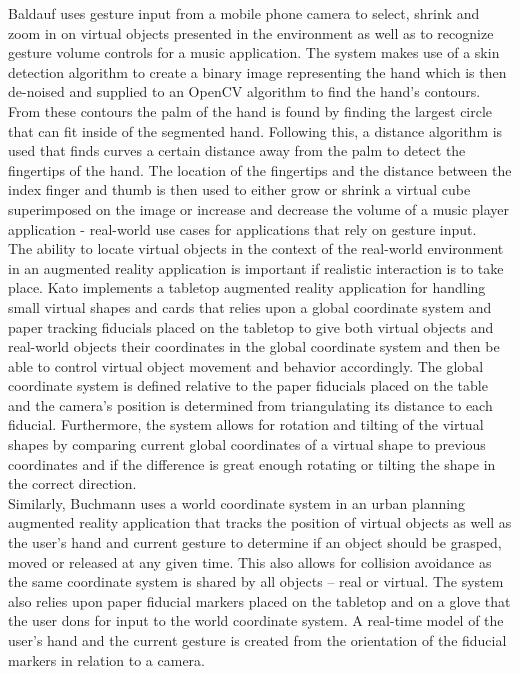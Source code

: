 Baldauf \cite{markerless_ar} uses gesture input from a mobile phone camera to select, shrink and zoom in on virtual objects presented in the environment as well as to recognize gesture volume controls for a music application. The system makes use of a skin detection algorithm to create a binary image representing the hand which is then de-noised and supplied to an OpenCV algorithm to find the hand's contours. From these contours the palm of the hand is found by finding the largest circle that can fit inside of the segmented hand. Following this, a distance algorithm is used that finds curves a certain distance away from the palm to detect the fingertips of the hand. The location of the fingertips and the distance between the index finger and thumb is then used to either grow or shrink a virtual cube superimposed on the image or increase and decrease the volume of a music player application - real-world use cases for applications that rely on gesture input. \\

The ability to locate virtual objects in the context of the real-world environment in an augmented reality application is important if realistic interaction is to take place. Kato \cite{ar_tabletop} implements a tabletop augmented reality application for handling small virtual shapes and cards that relies upon a global coordinate system and paper tracking fiducials placed on the tabletop to give both virtual objects and real-world objects their coordinates in the global coordinate system and then be able to control virtual object movement and behavior accordingly. The global coordinate system is defined relative to the paper fiducials placed on the table and the camera's position is determined from triangulating its distance to each fiducial. Furthermore, the system allows for rotation and tilting of the virtual shapes by comparing current global coordinates of a virtual shape to previous coordinates and if the difference is great enough rotating or tilting the shape in the correct direction. \\

Similarly, Buchmann \cite{fingartips} uses a world coordinate system in an urban planning augmented reality application that tracks the position of virtual objects as well as the user’s hand and current gesture to determine if an object should be grasped, moved or released at any given time. This also allows for collision avoidance as the same coordinate system is shared by all objects – real or virtual. The system also relies upon paper fiducial markers placed on the tabletop and on a glove that the user dons for input to the world coordinate system. A real-time model of the user's hand and the current gesture is created from the orientation of the fiducial markers in relation to a camera. \\

